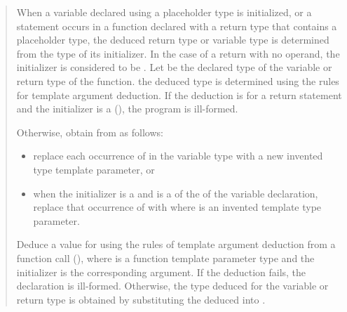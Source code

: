 \begin{quote}
\setcounter{Paras}{6}
\pnum
When a variable declared using a placeholder type is initialized, or 
a  statement occurs in a function declared with a 
return type that contains a placeholder type, the deduced return type 
or variable type is determined from the type of its initializer. 
% 
In the case of a return with no operand, the initializer is
considered to be . 
% 
Let  be the declared type of the variable or return 
type of the function. 
% 
the deduced type is determined using the rules for template argument
deduction. 
% 
If the deduction is for a return statement and the initializer is a 
(), the program is 
ill-formed. 
% 
% 
\begin{addedblock}
Otherwise, obtain  from  as follows:

\begin{itemize}
\item replace each occurrence of  in the variable type 
with a new invented type template parameter, or 

\item when the initializer is a 
and  is a 
of the  of
the variable declaration, replace that occurrence of  
with 
where  is an invented template type parameter.
\end{itemize}
\end{addedblock}
% 
Deduce a value for 
using the rules of template argument 
deduction from a function call 
(),
where  is a function template parameter type and the 
initializer is the corresponding argument. 
% 
If the deduction fails, the declaration is ill-formed. 
% 
Otherwise, the type deduced for the variable or return type is obtained 
by substituting the deduced 
into .
% 


\end{quote}
